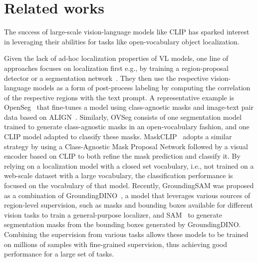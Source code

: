 \documentclass[10pt,twocolumn,letterpaper]{article}
\begin{document}
\section{Related works}
\label{sec:related_works}

The success of large-scale vision-language models like CLIP has sparked interest in leveraging their abilities for tasks like open-vocabulary object localization.

Given the lack of ad-hoc localization properties of VL models, one line of approaches focuses on localization first e.g., by training a region-proposal detector or a segmentation network~\citep{kirillov2023segment}. They then use the respective vision-language models as a form of post-process labeling by computing the correlation of the respective regions with the text prompt. 
A representative example is OpenSeg~\citep{ghiasi2022scaling} that fine-tunes a model using class-agnostic masks and image-text pair data based on ALIGN~\citep{jia2021scaling}. 
Similarly, OVSeg consists of one segmentation model trained to generate class-agnostic masks in an open-vocabulary fashion, and one CLIP model adapted to classify these masks. MaskCLIP~\citep{ding2022open} adopts a similar strategy by using a Class-Agnostic Mask Proposal Network followed by a visual encoder based on CLIP to both refine the mask prediction and classify it.
By relying on a localization model with a closed set vocabulary, i.e., not trained on a web-scale dataset with a large vocabulary, the classification performance is focused on the vocabulary of that model.
Recently, GroundingSAM was proposed as a combination of GroundingDINO~\citep{liu2023grounding}, a model that leverages various sources of region-level supervision, such as masks and bounding boxes available for different vision tasks to train a general-purpose localizer, and SAM~\citep{kirillov2023segment} to generate segmentation masks from the bounding boxes generated by GroundingDINO.
Combining the supervision from various tasks allows these models to be trained on millions of samples with fine-grained supervision, thus achieving good performance for a large set of tasks.
\end{document}
